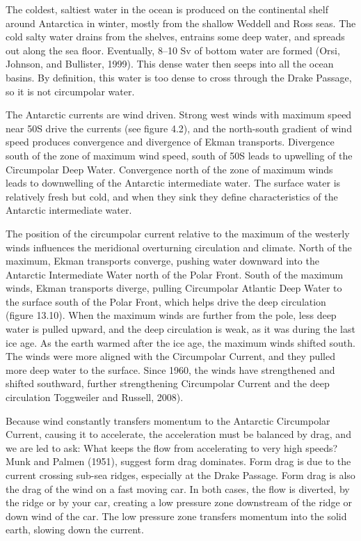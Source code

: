 The coldest, saltiest water in the ocean is produced on the continental shelf around Antarctica in winter, mostly from the shallow Weddell and Ross seas. The cold salty water drains from the shelves, entrains some deep water, and spreads out along the sea floor. Eventually, 8--10 Sv of bottom water are formed (Orsi, Johnson, and Bullister, 1999). This dense water then seeps into all the ocean basins. By definition, this water is too dense to cross through the Drake Passage, so it is not circumpolar water.

The Antarctic currents are wind driven. Strong west winds with maximum speed near 50\degrees S drive the currents (see figure 4.2), and the north-south gradient of wind speed produces convergence and divergence of Ekman transports. Divergence south of the zone of maximum wind speed, south of 50\degrees S leads to upwelling of the Circumpolar Deep Water. Convergence north of the zone of maximum winds leads to downwelling of
the Antarctic intermediate water. The surface water is relatively fresh but cold, and when they sink they define characteristics of the Antarctic intermediate water.

The position of the circumpolar current relative to the maximum of the westerly winds influences the meridional overturning circulation and climate. North of the maximum, Ekman transports converge, pushing water downward into the Antarctic Intermediate Water north of the Polar Front. South of the maximum winds, Ekman transports diverge, pulling Circumpolar Atlantic Deep Water to the surface south of the Polar Front, which helps drive the deep circulation (figure 13.10). When the maximum winds are further from the pole, less deep water is pulled upward, and the deep circulation is weak, as it was during the last ice age. As the earth warmed after the ice age, the maximum winds shifted south. The winds were more aligned with the Circumpolar Current, and they pulled more deep water to the surface. Since 1960, the winds have strengthened and shifted southward, further strengthening Circumpolar Current and the deep circulation Toggweiler and Russell, 2008).

Because wind constantly transfers momentum to the Antarctic Circumpolar Current,
causing it to accelerate, the acceleration must be balanced by drag,
and we are led to ask: What keeps the flow from accelerating to very high speeds?
Munk and Palmen (1951), suggest form drag dominates. Form drag is due to the current crossing sub-sea ridges, especially at
the Drake Passage. Form drag is also the drag of the wind on a fast moving car. In
both cases, the flow is diverted, by the ridge or by your car, creating a low
pressure zone downstream of the ridge or down wind of the car. The low pressure zone
transfers momentum into the solid earth, slowing down the current.

